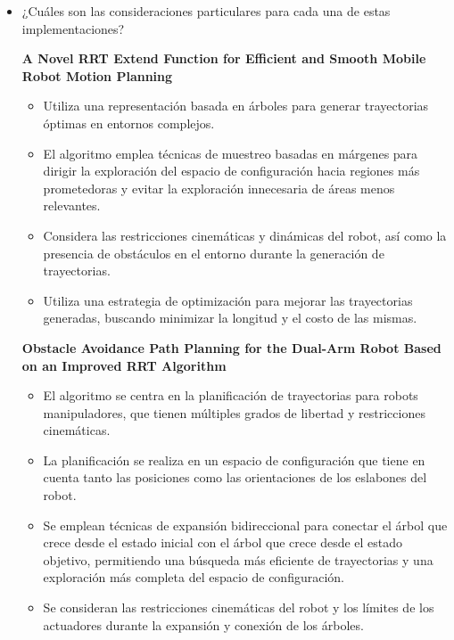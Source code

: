 \documentclass{article}
\begin{document}
\begin{itemize}

\item{¿Cuáles son las consideraciones particulares para cada una de estas implementaciones?} 

  \textbf{A Novel RRT Extend Function for Efficient and Smooth Mobile Robot Motion Planning}\\
  
  \begin{itemize}
  \item Utiliza una representación basada en árboles para generar trayectorias óptimas en entornos complejos.
  \item El algoritmo emplea técnicas de muestreo basadas en márgenes para dirigir la exploración del espacio de configuración hacia regiones más prometedoras y evitar la exploración innecesaria de áreas menos relevantes.
  \item Considera las restricciones cinemáticas y dinámicas del robot, así como la presencia de obstáculos en el entorno durante la generación de trayectorias.
  \item Utiliza una estrategia de optimización para mejorar las trayectorias generadas, buscando minimizar la longitud y el costo de las mismas.
  \end{itemize}

  \textbf{Obstacle Avoidance Path Planning for the Dual-Arm Robot Based on an Improved RRT Algorithm}\\
  
  \begin{itemize}
  \item El algoritmo se centra en la planificación de trayectorias para robots manipuladores, que tienen múltiples grados de libertad y restricciones cinemáticas.
  \item La planificación se realiza en un espacio de configuración que tiene en cuenta tanto las posiciones como las orientaciones de los eslabones del robot.
  \item Se emplean técnicas de expansión bidireccional para conectar el árbol que crece desde el estado inicial con el árbol que crece desde el estado objetivo, permitiendo una búsqueda más eficiente de trayectorias y una exploración más completa del espacio de configuración.
  \item Se consideran las restricciones cinemáticas del robot y los límites de los actuadores durante la expansión y conexión de los árboles.
  \end{itemize}
  

\end{itemize}
\end{document}
